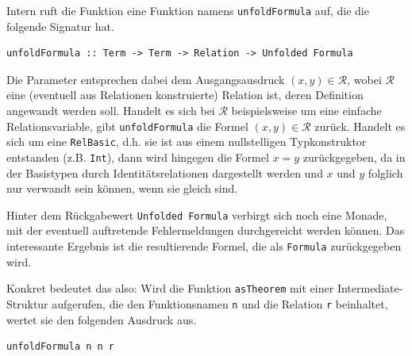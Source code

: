 
Intern ruft die Funktion eine Funktion namens \texttt{unfoldFormula} auf, die die folgende Signatur hat.

\begin{verbatim}
unfoldFormula :: Term -> Term -> Relation -> Unfolded Formula
\end{verbatim}

Die Parameter entsprechen dabei dem Ausgangsausdruck $(x, y) \in \mathcal{R}$, wobei $\mathcal{R}$ eine (eventuell aus
Relationen konstruierte) Relation ist, deren Definition angewandt werden soll. Handelt es sich bei $\mathcal{R}$ beispielsweise
um eine einfache Relationsvariable, gibt \texttt{unfoldFormula} die Formel $(x, y) \in \mathcal{R}$ zurück. Handelt es sich
um eine \texttt{RelBasic}, d.h. sie ist aus einem nullstelligen Typkonstruktor entstanden (z.B. \texttt{Int}), dann wird hingegen
die Formel $x = y$ zurückgegeben, da in der Basistypen durch Identitätsrelationen dargestellt werden und $x$ und $y$ folglich
nur verwandt sein können, wenn sie gleich sind.

Hinter dem Rückgabewert \texttt{Unfolded Formula} verbirgt sich noch eine Monade, mit der eventuell auftretende Fehlermeldungen
durchgereicht werden können. Das interessante Ergebnis ist die resultierende Formel, die als \texttt{Formula} zurückgegeben wird.

Konkret bedeutet das also: Wird die Funktion \texttt{asTheorem} mit einer Intermediate-Struktur aufgerufen, die den
Funktionsnamen \texttt{n} und die Relation \texttt{r} beinhaltet, wertet sie den folgenden Ausdruck aus.

\begin{verbatim}
unfoldFormula n n r
\end{verbatim}


%


